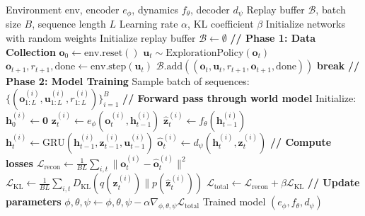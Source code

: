 \begin{algorithm}[H]
\caption{Complete World Model Training Pipeline}
\begin{algorithmic}[1]
\Require Environment env, encoder $e_\phi$, dynamics $f_\theta$, decoder $d_\psi$
\Require Replay buffer $\mathcal{B}$, batch size $B$, sequence length $L$
\Require Learning rate $\alpha$, KL coefficient $\beta$
\State Initialize networks with random weights
\State Initialize replay buffer $\mathcal{B} \gets \emptyset$
\State \textbf{// Phase 1: Data Collection}
    \State $\mathbf{o}_0 \gets \text{env.reset}()$
        \State $\mathbf{u}_t \sim \text{ExplorationPolicy}(\mathbf{o}_t)$ 
        \State $\mathbf{o}_{t+1}, r_{t+1}, \text{done} \gets \text{env.step}(\mathbf{u}_t)$
        \State $\mathcal{B}.\text{add}((\mathbf{o}_t, \mathbf{u}_t, r_{t+1}, \mathbf{o}_{t+1}, \text{done}))$
            \State \textbf{break}
        \EndIf
    \EndFor
\EndFor
\State \textbf{// Phase 2: Model Training}
    \State Sample batch of sequences: $\{(\mathbf{o}_{1:L}^{(i)}, \mathbf{u}_{1:L}^{(i)}, r_{1:L}^{(i)})\}_{i=1}^B$
    \State \textbf{// Forward pass through world model}
        \State Initialize: $\mathbf{h}_0^{(i)} \gets \mathbf{0}$
            \State $\mathbf{z}_t^{(i)} \gets e_\phi(\mathbf{o}_t^{(i)}, \mathbf{h}_{t-1}^{(i)})$ 
            \State $\hat{\mathbf{z}}_{t}^{(i)} \gets f_\theta(\mathbf{h}_{t-1}^{(i)})$ 
            \State $\mathbf{h}_t^{(i)} \gets \text{GRU}(\mathbf{h}_{t-1}^{(i)}, \mathbf{z}_{t-1}^{(i)}, \mathbf{u}_{t-1}^{(i)})$ 
            \State $\hat{\mathbf{o}}_t^{(i)} \gets d_\psi(\mathbf{h}_t^{(i)}, \mathbf{z}_t^{(i)})$ 
        \EndFor
    \EndFor
    \State \textbf{// Compute losses}
    \State $\mathcal{L}_{\text{recon}} \gets \frac{1}{BL} \sum_{i,t} \|\mathbf{o}_t^{(i)} - \hat{\mathbf{o}}_t^{(i)}\|^2$
    \State $\mathcal{L}_{\text{KL}} \gets \frac{1}{BL} \sum_{i,t} D_{\text{KL}}(q(\mathbf{z}_t^{(i)}) \| p(\hat{\mathbf{z}}_t^{(i)}))$
    \State $\mathcal{L}_{\text{total}} \gets \mathcal{L}_{\text{recon}} + \beta \mathcal{L}_{\text{KL}}$
    \State \textbf{// Update parameters}
    \State $\phi, \theta, \psi \gets \phi, \theta, \psi - \alpha \nabla_{\phi,\theta,\psi} \mathcal{L}_{\text{total}}$
\EndFor
\State \Return Trained model $(e_\phi, f_\theta, d_\psi)$
\end{algorithmic}
\end{algorithm}

